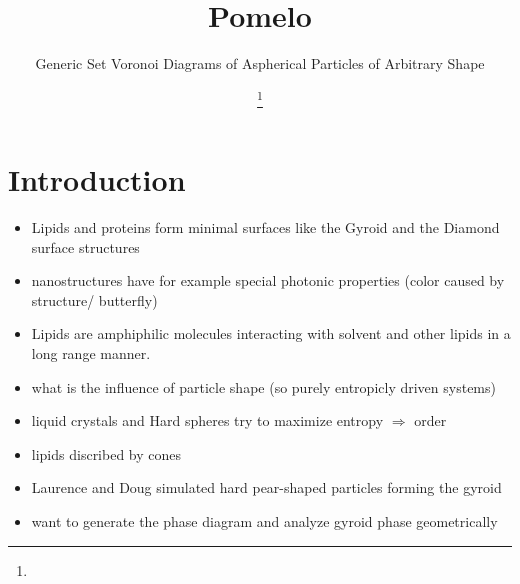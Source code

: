 \documentclass[epj,twocolumn]{webofc}
\begin{document}
%
\title{Pomelo}
%
%
\subtitle{Generic Set Voronoi Diagrams of Aspherical Particles of Arbitrary Shape}

\author{ \fnsep\thanks{} \and
         \and 
         \and
         \and
         
}


\abstract{%
}
%
\maketitle
%


\section{Introduction}
\label{sec:Intro}

\begin{itemize}
    \item Lipids and proteins form minimal surfaces like the Gyroid and the Diamond surface structures
    \item nanostructures have for example special photonic properties (color caused by structure/ butterfly)
    \item Lipids are amphiphilic molecules interacting with solvent and other lipids in a long range manner.
    \item what is the influence of particle shape (so purely entropicly driven systems)
    \item liquid crystals and Hard spheres try to maximize entropy $\Rightarrow$ order
    \item lipids discribed by cones
    \item Laurence and Doug simulated hard pear-shaped particles forming the gyroid
    \item want to generate the phase diagram and analyze gyroid phase geometrically
\end{itemize}
\end{document}
